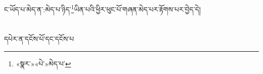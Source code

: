 ང་ཡོད་པ་མེད་ན་:མེད་པ་ཉིད་\footnote{«སྣར་»«པེ་»མེད་པ་}ཡིན་པའི་ཕྱིར་ཕུང་པོ་གཞན་མེད་པར་རྟོགས་པར་བྱེད་དེ།\chapter{ }དཔེར་ན་དངོས་པོ་དང་དངོས་པ